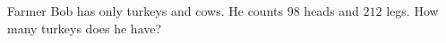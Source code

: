Farmer Bob has only turkeys and cows. He counts $98$ heads and $212$ legs. How many turkeys does he have?
